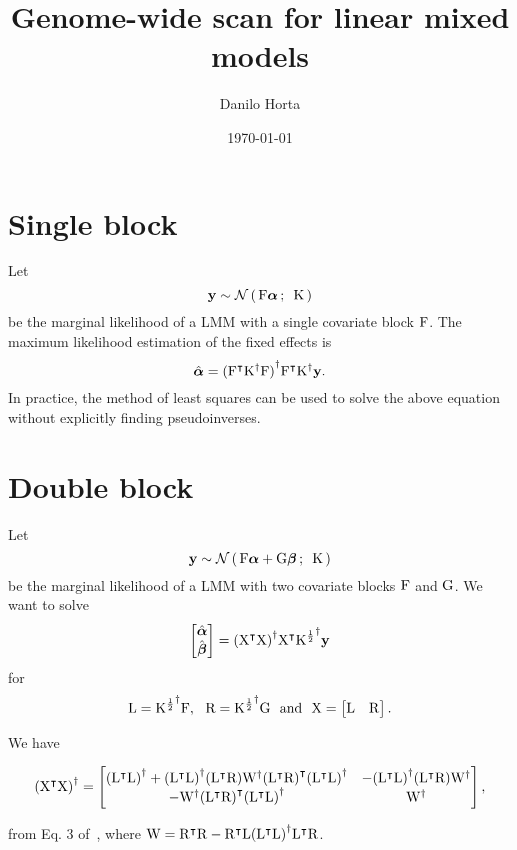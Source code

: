 \documentclass[twocolumn,draft]{article}
\title{Genome-wide scan for linear mixed models}
\author{Danilo Horta}
\date{\today}
\begin{document}
	\maketitle

\section{Single block}

Let
\begin{equation*}
  \mathbf{y} \sim \mathcal{N}\left(\, {\mathrm{F}\boldsymbol{\alpha}} \,;\,~{\mathrm{K}} \,\right)
\end{equation*}
be the marginal likelihood of a LMM with a single covariate block $\mathrm{F}$.
The maximum likelihood estimation of the fixed effects is
\begin{equation*}
	\hat{\boldsymbol{\alpha}} = {({\mathrm{F}}^\intercal{\mathrm{K}}^{\dagger}\mathrm{F})}^{\dagger}
	               {\mathrm{F}}^\intercal{\mathrm{K}}^{\dagger}\mathbf{y}.
\end{equation*}
In practice, the method of least squares can be used to solve the above
equation without explicitly finding pseudoinverses.

\section{Double block}

Let
\begin{equation*}
  \mathbf{y} \sim \mathcal{N}\left(\, {\mathrm{F}\boldsymbol{\alpha} + \mathrm{G}\boldsymbol{\beta}} \,;\,~{\mathrm{K}} \,\right)
\end{equation*}
be the marginal likelihood of a LMM with two covariate blocks $\mathrm{F}$ and
$\mathrm{G}$.
We want to solve
\begin{equation*}
	\begin{bmatrix}
		\hat{\boldsymbol{\alpha}} \\
		\hat{\boldsymbol{\beta}}
	\end{bmatrix} = {({\mathrm{X}}^\intercal\mathrm{X})}^{\dagger}{\mathrm{X}}^\intercal{\mathrm{K}^{\frac{1}{2}}}^{\dagger}\mathbf{y}
\end{equation*}
for
\begin{equation*}
\mathrm{L} = {\mathrm{K}^{\frac{1}{2}}}^{\dagger}\mathrm{F},~~ \mathrm{R} = {\mathrm{K}^{\frac{1}{2}}}^{\dagger}\mathrm{G}~~\text{and}~~
	\mathrm{X} =
		\begin{bmatrix}
			\mathrm{L} & \mathrm{R}
		\end{bmatrix}.
\end{equation*}

We have

\begin{strip}
	\begin{equation*}
		{({\mathrm{X}}^\intercal\mathrm{X})}^{\dagger} =
		\begin{bmatrix}
			{({\mathrm{L}}^\intercal\mathrm{L})}^{\dagger} + {({\mathrm{L}}^\intercal\mathrm{L})}^{\dagger} ({\mathrm{L}}^\intercal\mathrm{R})
				{\mathrm{W}}^{\dagger} {({\mathrm{L}}^\intercal\mathrm{R})}^\intercal {({\mathrm{L}}^\intercal\mathrm{L})}^{\dagger}
				& - {({\mathrm{L}}^\intercal\mathrm{L})}^{\dagger} ({\mathrm{L}}^\intercal\mathrm{R})
				{\mathrm{W}}^{\dagger} \\
			- {\mathrm{W}}^{\dagger} {({\mathrm{L}}^\intercal\mathrm{R})}^\intercal
			{({\mathrm{L}}^\intercal\mathrm{L})}^{\dagger} & {\mathrm{W}}^{\dagger}
		\end{bmatrix},
	\end{equation*}
\end{strip}
from Eq. 3 of~\cite{rohde1965generalized}, where
$\mathrm{W} = {\mathrm{R}}^\intercal\mathrm{R} - {\mathrm{R}}^\intercal\mathrm{L}{({\mathrm{L}}^\intercal\mathrm{L})}^{\dagger}
{\mathrm{L}}^\intercal\mathrm{R}$.
\end{document}
